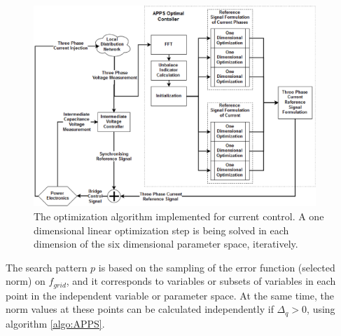         \begin{figure}[h]
        \centering
        \includegraphics[width=0.95\textwidth]{Unblance_EPS_Pics/APPS_1_2_.eps}
        \caption{The optimization algorithm implemented for current control. A one dimensional linear optimization step is being solved in each dimension of the six dimensional parameter space, iteratively.}
        \label{fig:APPS}
        \end{figure}

         The search pattern $p$ is based on the sampling of the error function (selected norm) on $f_{grid}$, and it corresponds to variables or subsets of variables in each point in the independent variable or parameter space. At the same time, the norm values at these points can be calculated independently if $\Delta_q>0$, using algorithm \ref{algo:APPS}.
				

